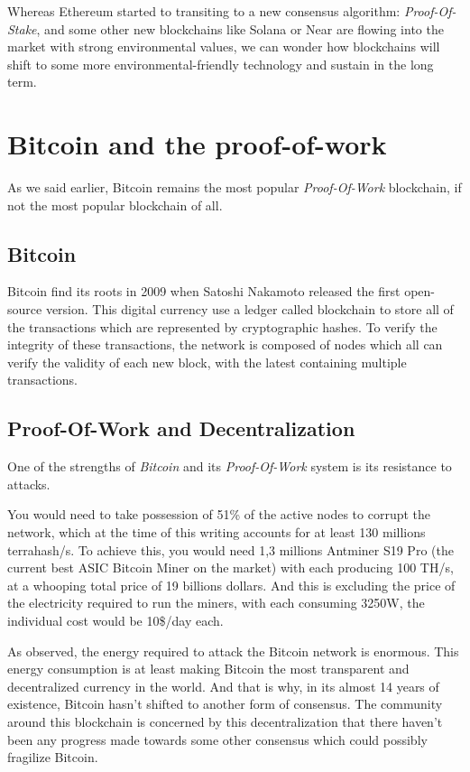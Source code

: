 \documentclass{ifacconf}
\begin{document}
Whereas Ethereum started to transiting to a new consensus algorithm: \textit{Proof-Of-Stake}, and some other new blockchains like Solana or Near are flowing into the market with strong environmental values, we can wonder how blockchains will shift to some more environmental-friendly technology and sustain in the long term.


\section{Bitcoin and the proof-of-work}

As we said earlier, Bitcoin remains the most popular \textit{Proof-Of-Work} blockchain, if not the most popular blockchain of all. 

\subsection{Bitcoin}

Bitcoin find its roots in 2009 when Satoshi Nakamoto released the first open-source version. This digital currency use a ledger called blockchain to store all of the transactions which are represented by cryptographic hashes. To verify the integrity of these transactions, the network is composed of nodes which all can verify the validity of each new block, with the latest containing multiple transactions.

\subsection{Proof-Of-Work and Decentralization}

One of the strengths of \textit{Bitcoin} and its \textit{Proof-Of-Work} system is its resistance to attacks. 
\begin{pf}  
You would need to take possession of 51\% of the active nodes to corrupt the network, which at the time of this writing accounts for at least 130 millions terrahash/s. To achieve this, you would need 1,3 millions Antminer S19 Pro (the current best ASIC Bitcoin Miner on the market) with each producing 100 TH/s, at a whooping total price of 19 billions dollars. And this is excluding the price of the electricity required to run the miners, with each consuming 3250W, the individual cost would be 10\$/day each.
\end{pf}

As observed, the energy required to attack the Bitcoin network is enormous.
This energy consumption is at least making Bitcoin the most transparent and decentralized currency in the world. And that is why, in its almost 14 years of existence, Bitcoin hasn't shifted to another form of consensus. The community around this blockchain is concerned by this decentralization that there haven't been any progress made towards some other consensus which could possibly fragilize Bitcoin.
\end{document}
